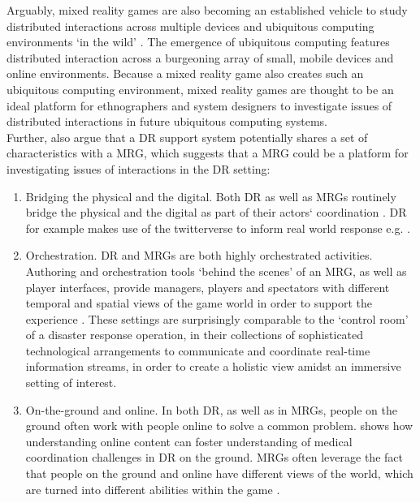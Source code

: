 Arguably, mixed reality games are also becoming an established vehicle to study distributed interactions across multiple devices and ubiquitous computing environments `in the wild' \citep{Crabtree2006, Benford2005, Fischer2012}. The emergence of ubiquitous computing features distributed interaction across a burgeoning array of small, mobile devices and online environments. Because a mixed reality game also creates such an ubiquitous computing environment,  mixed reality games are thought to be an ideal platform for ethnographers and system designers to investigate issues of distributed interactions in future ubiquitous computing systems.\\

Further, \cite{Fischer2012} also argue that a \ac{DR} support system potentially shares a set of characteristics with a \ac{MRG}, which suggests that a \ac{MRG} could be a platform for investigating issues of interactions in the \ac{DR} setting:\\

\begin{enumerate}
\item Bridging the physical and the digital. Both \ac{DR} as well as \ac{MRG}s routinely bridge the physical and the digital as part of their actors` coordination \citep{Benford2005}. \ac{DR} for example makes use of the twitterverse to inform real world response e.g. \citep{Sarcevic2012}.

\item Orchestration. \ac{DR} and \ac{MRG}s are both highly orchestrated activities. Authoring and orchestration tools `behind the scenes' of an \ac{MRG}, as well as player interfaces, provide managers, players and spectators with different temporal and spatial views of the game world in order to support the experience \citep{Crabtree2004}. These settings are surprisingly comparable to the `control room' of a disaster response operation, in their collections of sophisticated technological arrangements to communicate and coordinate real-time information streams, in order to create a holistic view amidst an immersive setting of interest.\\

\item On-the-ground and online. In both \ac{DR}, as well as in \ac{MRG}s, people on the ground often work with people online to solve a common problem. \cite{Sarcevic2012} shows how understanding online content can foster understanding of medical coordination challenges in \ac{DR} on the ground. \ac{MRG}s often leverage the fact that people on the ground and online have different views of the world, which are turned into different abilities within the game \citep{Flintham2003}.\\ 

\end{enumerate}

